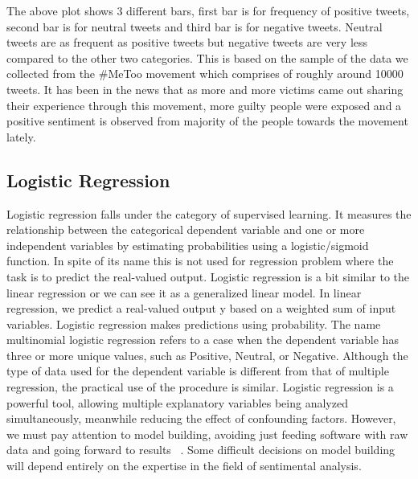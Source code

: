 The above plot shows 3 different bars, first bar is for frequency of positive 
tweets, second bar is for neutral tweets and third bar is for negative tweets. 
Neutral tweets are as frequent as positive tweets but negative tweets are very 
less compared to the other two categories. This is based on the sample of the 
data we collected from the #MeToo movement which comprises of roughly around 
10000 tweets. It has been in the news that as more and more victims came 
out sharing their experience through this movement, more guilty people were 
exposed and a positive sentiment is observed from majority of the people 
towards the movement lately. 


\subsection{Logistic Regression}
Logistic regression falls under the category of supervised learning. It measures 
the relationship between the categorical dependent variable and one or more independent 
variables by estimating probabilities using a logistic/sigmoid function. In spite 
of its name this is not used for regression problem where the task is to predict the 
real-valued output. Logistic regression is a bit similar to the linear regression or we 
can see it as a generalized linear model. In linear regression, we predict a 
real-valued output y based on a weighted sum of input variables. 
Logistic regression makes predictions using probability.  The name multinomial logistic 
regression refers to a case when the dependent variable has three or more unique values, 
such as Positive, Neutral, or Negative. Although the type of data used for the dependent 
variable is different from that of multiple regression, the practical use of the procedure 
is similar. Logistic regression is a powerful tool, allowing multiple explanatory 
variables being analyzed simultaneously, meanwhile reducing the effect of confounding factors. 
However, we must pay attention to model building, avoiding just feeding software 
with raw data and going forward to results ~\cite{hid-sp18-418-regression}. 
Some difficult decisions on model building will depend entirely on the expertise in 
the field of sentimental analysis.

